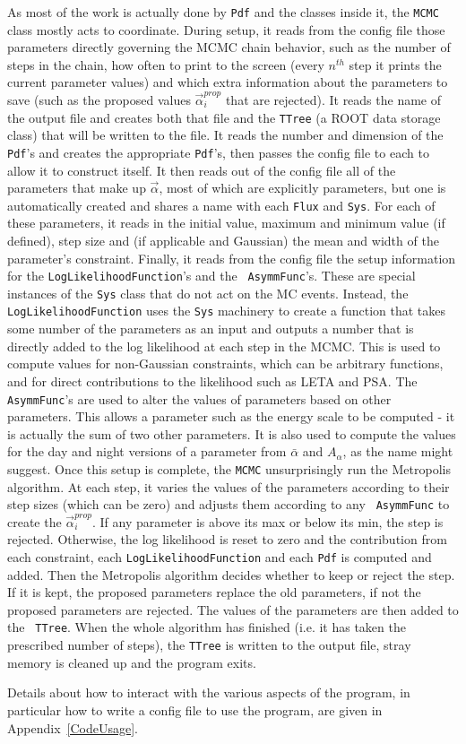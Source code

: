 As most of the work is actually done by {\tt Pdf} and the classes
inside it, the {\tt MCMC} class mostly acts to coordinate.  During
setup, it reads from the config file those parameters directly
governing the MCMC chain behavior, such as the number of steps in the
chain, how often to print to the screen (every $n^{th}$ step it prints
the current parameter values) and which extra information about the
parameters to save (such as the proposed values
$\vec{\alpha}_i^{prop}$ that are rejected).  It reads the name of the
output file and creates both that file and the {\tt TTree} (a ROOT
data storage class) that will be written to the file.  It reads the
number and dimension of the {\tt Pdf}'s and creates the appropriate
{\tt Pdf}'s, then passes the config file to each to allow it to
construct itself.  It then reads out of the config file all of the
parameters that make up $\vec{\alpha}$, most of which are explicitly
parameters, but one is automatically created and shares a name with
each {\tt Flux} and {\tt Sys}.  For each of these parameters, it reads
in the initial value, maximum and minimum value (if defined), step
size and (if applicable and Gaussian) the mean and width of the
parameter's constraint.  Finally, it reads from the config file the
setup information for the {\tt LogLikelihoodFunction}'s and the {\tt
AsymmFunc}'s.  These are special instances of the {\tt Sys} class that
do not act on the MC events.  Instead, the {\tt LogLikelihoodFunction}
uses the {\tt Sys} machinery to create a function that takes some
number of the parameters as an input and outputs a number that is
directly added to the log likelihood at each step in the MCMC.  This
is used to compute values for non-Gaussian constraints, which can be
arbitrary functions, and for direct contributions to the likelihood
such as LETA and PSA.  The {\tt AsymmFunc}'s are used to alter the
values of parameters based on other parameters.  This allows a
parameter such as the energy scale to be computed - it is actually the
sum of two other parameters.  It is also used to compute the values
for the day and night versions of a parameter from $\bar{\alpha}$ and
$A_{\alpha}$, as the name might suggest.  Once this setup is complete,
the {\tt MCMC} unsurprisingly run the Metropolis algorithm.  At each
step, it varies the values of the parameters according to their step
sizes (which can be zero) and adjusts them according to any {\tt
AsymmFunc} to create the $\vec{\alpha}_i^{prop}$.  If any parameter is
above its max or below its min, the step is rejected.  Otherwise, the
log likelihood is reset to zero and the contribution from each
constraint, each {\tt LogLikelihoodFunction} and each {\tt Pdf} is
computed and added.  Then the Metropolis algorithm decides whether to
keep or reject the step.  If it is kept, the proposed parameters
replace the old parameters, if not the proposed parameters are
rejected.  The values of the parameters are then added to the {\tt
TTree}.  When the whole algorithm has finished (i.e. it has taken the
prescribed number of steps), the {\tt TTree} is written to the output
file, stray memory is cleaned up and the program exits.

Details about how to interact with the various aspects of the program,
in particular how to write a config file to use the program, are given
in \mbox{Appendix \ref{CodeUsage}}.

